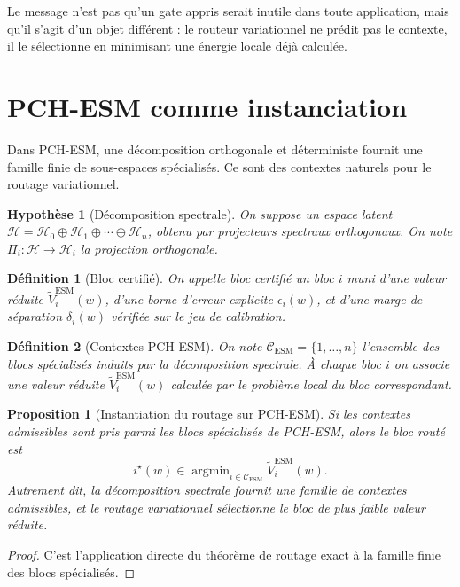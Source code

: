 \documentclass[11pt,a4paper]{article}
\newtheorem{definition}{Définition}[section]
\newtheorem{assumption}{Hypothèse}[section]
\newtheorem{proposition}{Proposition}[section]
\DeclareMathOperator{\argmin}{argmin}
\newcommand{\Hh}{\mathcal H}
\newcommand{\Ccal}{\mathcal C}
\begin{document}
Le message n'est pas qu'un gate appris serait inutile dans toute application, mais qu'il s'agit d'un objet différent : le routeur variationnel ne prédit pas le contexte, il le sélectionne en minimisant une énergie locale déjà calculée.

\section{PCH-ESM comme instanciation}

Dans PCH-ESM, une décomposition orthogonale et déterministe fournit une famille finie de sous-espaces spécialisés. Ce sont des contextes naturels pour le routage variationnel.

\begin{assumption}[Décomposition spectrale]
On suppose un espace latent \(\Hh=\Hh_0\oplus \Hh_1\oplus\cdots\oplus \Hh_n\), obtenu par projecteurs spectraux orthogonaux. On note \(\Pi_i:\Hh\to\Hh_i\) la projection orthogonale.
\end{assumption}

\begin{definition}[Bloc certifié]
On appelle bloc certifié un bloc \(i\) muni d'une valeur réduite \(\widetilde V_i^{\mathrm{ESM}}(w)\), d'une borne d'erreur explicite \(\epsilon_i(w)\), et d'une marge de séparation \(\delta_i(w)\) vérifiée sur le jeu de calibration.
\end{definition}

\begin{definition}[Contextes PCH-ESM]
On note \(\Ccal_{\mathrm{ESM}}=\{1,\dots,n\}\) l'ensemble des blocs spécialisés induits par la décomposition spectrale. À chaque bloc \(i\) on associe une valeur réduite \(\widetilde V_i^{\mathrm{ESM}}(w)\) calculée par le problème local du bloc correspondant.
\end{definition}

\begin{proposition}[Instantiation du routage sur PCH-ESM]
Si les contextes admissibles sont pris parmi les blocs spécialisés de PCH-ESM, alors le bloc routé est
\[
i^\star(w)\in\argmin_{i\in\Ccal_{\mathrm{ESM}}}\widetilde V_i^{\mathrm{ESM}}(w).
\]
Autrement dit, la décomposition spectrale fournit une famille de contextes admissibles, et le routage variationnel sélectionne le bloc de plus faible valeur réduite.
\end{proposition}

\begin{proof}
C'est l'application directe du théorème de routage exact à la famille finie des blocs spécialisés.
\end{proof}
\end{document}
